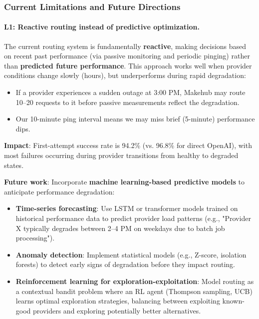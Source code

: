 \documentclass[english]{article}
\begin{document}
\subsubsection{Current Limitations and Future Directions}

\paragraph{L1: Reactive routing instead of predictive optimization.}

The current routing system is fundamentally \textbf{reactive}, making decisions based on recent past performance (via passive monitoring and periodic pinging) rather than \textbf{predicted future performance}. This approach works well when provider conditions change slowly (hours), but underperforms during rapid degradation:
\begin{itemize}
    \item If a provider experiences a sudden outage at 3:00 PM, Makehub may route 10--20 requests to it before passive measurements reflect the degradation.
    \item Our 10-minute ping interval means we may miss brief (5-minute) performance dips.
\end{itemize}

\textbf{Impact}: First-attempt success rate is 94.2\% (vs. 96.8\% for direct OpenAI), with most failures occurring during provider transitions from healthy to degraded states.

\textbf{Future work}: Incorporate \textbf{machine learning-based predictive models} to anticipate performance degradation:
\begin{itemize}
    \item \textbf{Time-series forecasting}: Use LSTM or transformer models trained on historical performance data to predict provider load patterns (e.g., "Provider X typically degrades between 2--4 PM on weekdays due to batch job processing").
    \item \textbf{Anomaly detection}: Implement statistical models (e.g., Z-score, isolation forests) to detect early signs of degradation before they impact routing.
    \item \textbf{Reinforcement learning for exploration-exploitation}: Model routing as a contextual bandit problem where an RL agent (Thompson sampling, UCB) learns optimal exploration strategies, balancing between exploiting known-good providers and exploring potentially better alternatives.
\end{itemize}
\end{document}
